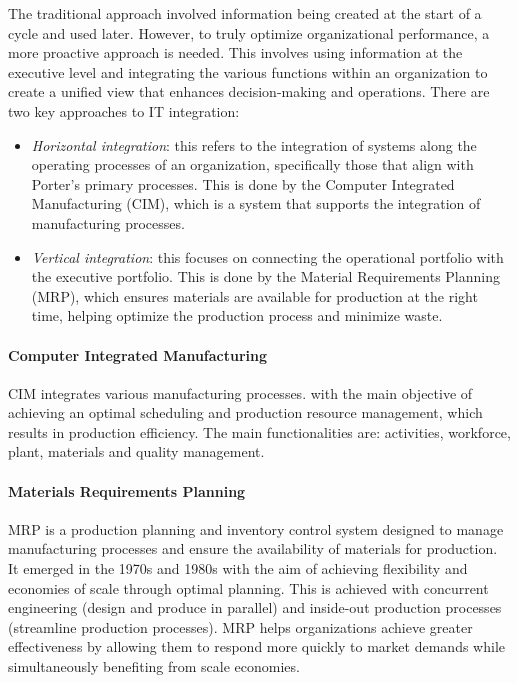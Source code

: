 The traditional approach involved information being created at the start of a cycle and used later. 
However, to truly optimize organizational performance, a more proactive approach is needed. 
This involves using information at the executive level and integrating the various functions within an organization to create a unified view that enhances decision-making and operations.
There are two key approaches to IT integration:
\begin{itemize}
    \item \textit{Horizontal integration}: this refers to the integration of systems along the operating processes of an organization, specifically those that align with Porter's primary processes.
        This is done by the Computer Integrated Manufacturing (CIM), which is a system that supports the integration of manufacturing processes. 
    \item \textit{Vertical integration}: this focuses on connecting the operational portfolio with the executive portfolio. 
        This is done by the Material Requirements Planning (MRP), which ensures materials are available for production at the right time, helping optimize the production process and minimize waste.
\end{itemize}

\paragraph*{Computer Integrated Manufacturing}
CIM integrates various manufacturing processes. with the main objective of achieving an optimal scheduling and production resource management, which results in production efficiency. 
The main functionalities are: activities, workforce, plant, materials and quality management. 

\paragraph*{Materials Requirements Planning}
MRP is a production planning and inventory control system designed to manage manufacturing processes and ensure the availability of materials for production.
It emerged in the 1970s and 1980s with the aim of achieving flexibility and economies of scale through optimal planning. 
This is achieved with concurrent engineering (design and produce in parallel) and inside-out production processes (streamline production processes). 
MRP helps organizations achieve greater effectiveness by allowing them to respond more quickly to market demands while simultaneously benefiting from scale economies. 